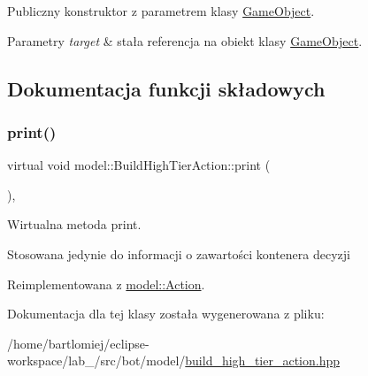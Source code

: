 Publiczny konstruktor z parametrem klasy \hyperlink{classmodel_1_1GameObject}{Game\+Object}. 


\begin{DoxyParams}{Parametry}
{\em target} & stała referencja na obiekt klasy \hyperlink{classmodel_1_1GameObject}{Game\+Object}. \\
\hline
\end{DoxyParams}


\subsection{Dokumentacja funkcji składowych}
\mbox{\label{classmodel_1_1BuildHighTierAction_a587f7c8efb015bbc00cb706e7e289edf}} 
\subsubsection{\texorpdfstring{print()}{print()}}
{\footnotesize\ttfamily virtual void model\+::\+Build\+High\+Tier\+Action\+::print (\begin{DoxyParamCaption}{ }\end{DoxyParamCaption})\hspace{0.3cm}{\ttfamily [inline]}, {\ttfamily [virtual]}}



Wirtualna metoda print. 

Stosowana jedynie do informacji o zawartości kontenera decyzji 

Reimplementowana z \hyperlink{classmodel_1_1Action_a2955dbb4a69e38a48aa07d730fe2d77c}{model\+::\+Action}.



Dokumentacja dla tej klasy została wygenerowana z pliku\+:\begin{DoxyCompactItemize}
\item 
/home/bartlomiej/eclipse-\/workspace/lab\+\_/src/bot/model/\hyperlink{build__high__tier__action_8hpp}{build\+\_\+high\+\_\+tier\+\_\+action.\+hpp}\end{DoxyCompactItemize}
